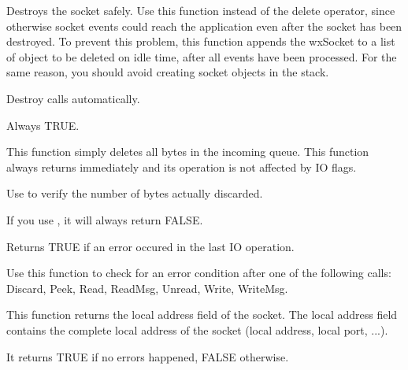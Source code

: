 %
%
\label{wxsocketbasedestroy}


Destroys the socket safely. Use this function instead of the delete operator,
since otherwise socket events could reach the application even after the
socket has been destroyed. To prevent this problem, this function appends
the wxSocket to a list of object to be deleted on idle time, after all
events have been processed. For the same reason, you should avoid creating
socket objects in the stack.

Destroy calls  automatically.


Always TRUE.

%
%
\label{wxsocketbasediscard}


This function simply deletes all bytes in the incoming queue. This function
always returns immediately and its operation is not affected by IO flags.

Use  to verify the number of bytes actually discarded.

If you use , it will always return FALSE.

%
%
\label{wxsocketbaseerror}


Returns TRUE if an error occured in the last IO operation.

Use this function to check for an error condition after one of the
following calls: Discard, Peek, Read, ReadMsg, Unread, Write, WriteMsg.

%
%
\label{wxsocketbasegetlocal}


This function returns the local address field of the socket. The local
address field contains the complete local address of the socket (local
address, local port, ...).


It returns TRUE if no errors happened, FALSE otherwise.

%
%
\label{wxsocketbasegetpeer}

